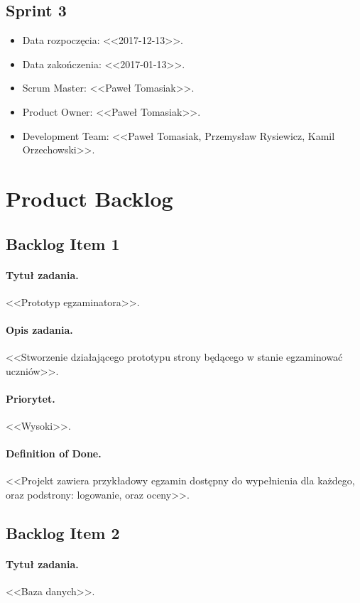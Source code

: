 \documentclass[a4paper]{article}
\begin{document}
\subsection{Sprint 3}

\begin{itemize}
\item Data rozpoczęcia: <<2017-12-13>>.
\item  Data zakończenia: <<2017-01-13>>.
\item Scrum Master: <<Paweł Tomasiak>>.
\item Product Owner: <<Paweł Tomasiak>>.
\item Development Team: <<Paweł Tomasiak, Przemysław Rysiewicz, Kamil Orzechowski>>.
\end{itemize}


\section{Product Backlog}

\subsection{Backlog Item 1}
\paragraph{Tytuł zadania.} <<Prototyp egzaminatora>>.
\paragraph{Opis zadania.} <<Stworzenie działającego prototypu strony będącego w stanie egzaminować uczniów>>.
\paragraph{Priorytet.} <<Wysoki>>.
\paragraph{Definition of Done.} <<Projekt zawiera przykładowy egzamin dostępny do wypełnienia dla każdego, oraz podstrony: logowanie, oraz oceny>>.

\subsection{Backlog Item 2}
\paragraph{Tytuł zadania.} <<Baza danych>>.
\end{document}
